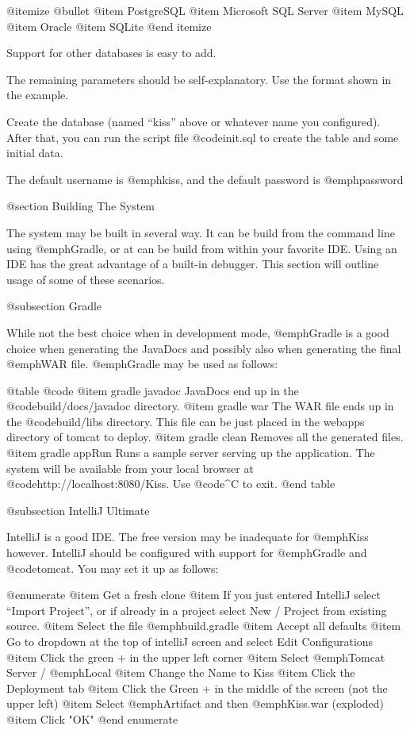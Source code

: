 @itemize @bullet
@item
PostgreSQL
@item
Microsoft SQL Server
@item
MySQL
@item
Oracle
@item
SQLite
@end itemize

Support for other databases is easy to add.

The remaining parameters should be self-explanatory.  Use the format shown in the example.

Create the database (named ``kiss'' above or whatever name you
configured).  After that, you can run the script file @code{init.sql}
to create the table and some initial data.

The default username is @emph{kiss}, and the default password is @emph{password}

@section Building The System

The system may be built in several way.  It can be build from the
command line using @emph{Gradle}, or at can be build from within your
favorite IDE.  Using an IDE has the great advantage of a built-in
debugger.  This section will outline usage of some of these scenarios.

@subsection Gradle 

While not the best choice when in development mode, @emph{Gradle} is a
good choice when generating the JavaDocs and possibly also when
generating the final @emph{WAR} file.  @emph{Gradle} may be used as follows:

@table @code
@item gradle javadoc
JavaDocs end up in the @code{build/docs/javadoc} directory.
@item gradle war
The WAR file ends up in the @code{build/libs} directory.  This file can be just placed in the webapps directory of tomcat to deploy.
@item gradle clean
Removes all the generated files.
@item gradle appRun
Runs a sample server serving up the application.  The system will be
available from your local browser at
@code{http://localhost:8080/Kiss}.  Use @code{^C} to exit.
@end table

@subsection IntelliJ Ultimate

IntelliJ is a good IDE.  The free version may be inadequate for
@emph{Kiss} however.  IntelliJ should be configured with support for
@emph{Gradle} and @code{tomcat}.  You may set it up as follows:

@enumerate
@item
Get a fresh clone
@item
If you just entered IntelliJ select ``Import Project'', or if already in a project select New / Project from existing source.
@item
Select the file @emph{build.gradle}
@item
Accept all defaults
@item
Go to dropdown at the top of intelliJ screen and select Edit Configurations
@item
Click the green + in the upper left corner
@item
Select @emph{Tomcat Server} / @emph{Local}
@item
Change the Name to Kiss
@item
Click the Deployment tab
@item
Click the Green + in the middle of the screen (not the upper left)
@item
Select @emph{Artifact} and then @emph{Kiss.war} (exploded)
@item
Click "OK"
@end enumerate

